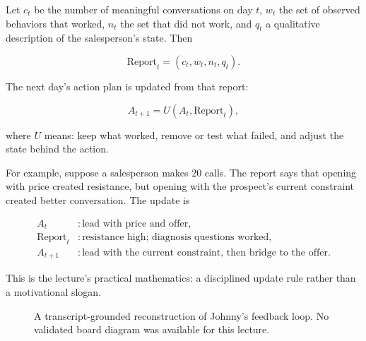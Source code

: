 Let \(c_t\) be the number of meaningful conversations on day \(t\), \(w_t\) the set of observed behaviors that worked, \(n_t\) the set that did not work, and \(q_t\) a qualitative description of the salesperson's state. Then

\begin{equation}
\text{Report}_t=(c_t,w_t,n_t,q_t).
\end{equation}

The next day's action plan is updated from that report:

\begin{equation}
A_{t+1}=U(A_t,\text{Report}_t),
\end{equation}

where \(U\) means: keep what worked, remove or test what failed, and adjust the state behind the action.

For example, suppose a salesperson makes \(20\) calls. The report says that opening with price created resistance, but opening with the prospect's current constraint created better conversation. The update is

\begin{align}
A_t &: \text{lead with price and offer},\\
\text{Report}_t &: \text{resistance high; diagnosis questions worked},\\
A_{t+1} &: \text{lead with the current constraint, then bridge to the offer}.
\end{align}

This is the lecture's practical mathematics: a disciplined update rule rather than a motivational slogan.

\begin{figure}
\centering
{}
\caption{A transcript-grounded reconstruction of Johnny's feedback loop. No validated board diagram was available for this lecture.}
\end{figure}

